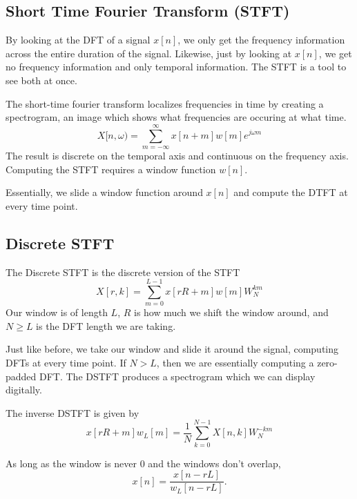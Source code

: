 \subsection{Short Time Fourier Transform (STFT)}
By looking at the DFT of a signal $x[n]$, we only get the frequency information across the entire duration of the signal.
Likewise, just by looking at $x[n]$, we get no frequency information and only temporal information. The STFT is a tool to see both at once.
\begin{definition}
  The short-time fourier transform localizes frequencies in time by creating a spectrogram, an image which shows what frequencies are occuring at what time.
  \[
	X[n, \omega) = \sum_{m=-\infty}^{\infty}x[n+m]w[m]e^{j\omega m}
  \]
  The result is discrete on the temporal axis and continuous on the frequency axis. Computing the STFT requires a window function $w[n]$.
  \label{defn:stft}
\end{definition}
Essentially, we slide a window function around $x[n]$ and compute the DTFT at every time point. 
\subsection{Discrete STFT}
\begin{definition}
  The Discrete STFT is the discrete version of the STFT
  \[
	X[r, k] = \sum_{m=0}^{L-1}x[rR+m]w[m]W_N^{km}
  \]
  Our window is of length $L$, $R$ is how much we shift the window around, and $N \ge L$ is the DFT length we are taking.
  \label{defn:dstft}
\end{definition}
Just like before, we take our window and slide it around the signal, computing DFTs at every time point.
If $N > L$, then we are essentially computing a zero-padded DFT. 
The DSTFT produces a spectrogram which we can display digitally.
\begin{definition}
  The inverse DSTFT is given by
  \[
	x[rR+m]w_L[m] = \frac{1}{N}\sum_{k=0}^{N-1}X[n, k]W_N^{-km}
  \]
  \label{defn:idstft}
\end{definition}
As long as the window is never 0 and the windows don't overlap,
\[
  x[n] = \frac{x[n-rL]}{w_L[n-rL]}.
\]
